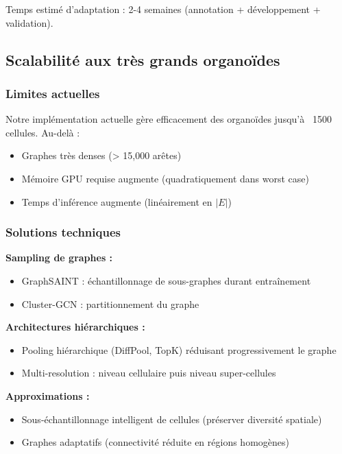 Temps estimé d'adaptation : 2-4 semaines (annotation + développement + validation).

\subsection{Scalabilité aux très grands organoïdes}

\subsubsection{Limites actuelles}

Notre implémentation actuelle gère efficacement des organoïdes jusqu'à ~1500 cellules. Au-delà :
\begin{itemize}
    \item Graphes très denses (> 15,000 arêtes)
    \item Mémoire GPU requise augmente (quadratiquement dans worst case)
    \item Temps d'inférence augmente (linéairement en $|E|$)
\end{itemize}

\subsubsection{Solutions techniques}

\textbf{Sampling de graphes :}
\begin{itemize}
    \item GraphSAINT : échantillonnage de sous-graphes durant entraînement
    \item Cluster-GCN : partitionnement du graphe
\end{itemize}

\textbf{Architectures hiérarchiques :}
\begin{itemize}
    \item Pooling hiérarchique (DiffPool, TopK) réduisant progressivement le graphe
    \item Multi-resolution : niveau cellulaire puis niveau super-cellules
\end{itemize}

\textbf{Approximations :}
\begin{itemize}
    \item Sous-échantillonnage intelligent de cellules (préserver diversité spatiale)
    \item Graphes adaptatifs (connectivité réduite en régions homogènes)
\end{itemize}

